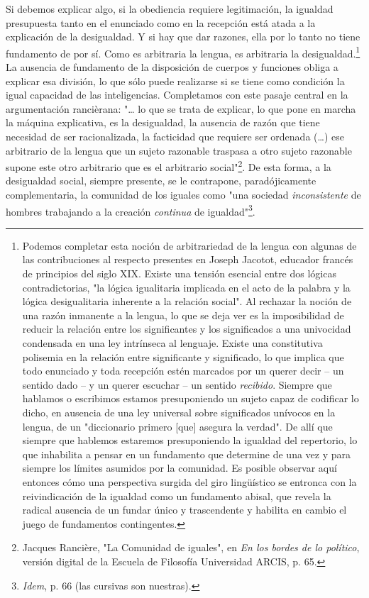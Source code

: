 \documentclass{book}
\begin{document}
Si debemos explicar algo, si la obediencia requiere legitimación, la
igualdad presupuesta tanto en el enunciado como en la recepción está
atada a la explicación de la desigualdad. Y si hay que dar razones, ella
por lo tanto no tiene fundamento de por sí. Como es arbitraria la
lengua, es arbitraria la desigualdad.\footnote{Podemos completar esta
  noción de arbitrariedad de la lengua con algunas de las contribuciones
  al respecto presentes en Joseph Jacotot, educador francés de
  principios del siglo XIX. Existe una tensión esencial entre dos
  lógicas contradictorias, "la lógica igualitaria implicada en el acto
  de la palabra y la lógica desigualitaria inherente a la relación
  social". Al rechazar la noción de una razón inmanente a la lengua, lo
  que se deja ver es la imposibilidad de reducir la relación entre los
  significantes y los significados a una univocidad condensada en una
  ley intrínseca al lenguaje. Existe una constitutiva polisemia en la
  relación entre significante y significado, lo que implica que todo
  enunciado y toda recepción estén marcados por un querer decir -- un
  sentido dado -- y un querer escuchar -- un sentido \emph{recibido}.
  Siempre que hablamos o escribimos estamos presuponiendo un sujeto
  capaz de codificar lo dicho, en ausencia de una ley universal sobre
  significados unívocos en la lengua, de un "diccionario primero
  {[}que{]} asegura la verdad". De allí que siempre que hablemos
  estaremos presuponiendo la igualdad del repertorio, lo que inhabilita
  a pensar en un fundamento que determine de una vez y para siempre los
  límites asumidos por la comunidad. Es posible observar aquí entonces
  cómo una perspectiva surgida del giro lingüístico se entronca con la
  reivindicación de la igualdad como un fundamento abisal, que revela la
  radical ausencia de un fundar único y trascendente y habilita en
  cambio el juego de fundamentos contingentes.} La ausencia de
fundamento de la disposición de cuerpos y funciones obliga a explicar
esa división, lo que sólo puede realizarse si se tiene como condición la
igual capacidad de las inteligencias. Completamos con este pasaje
central en la argumentación rancièrana: "\ldots{} lo que se trata de
explicar, lo que pone en marcha la máquina explicativa, es la
desigualdad, la ausencia de razón que tiene necesidad de ser
racionalizada, la facticidad que requiere ser ordenada (\dots) ese
arbitrario de la lengua que un sujeto razonable traspasa a otro sujeto
razonable supone este otro arbitrario que es el arbitrario
social"\footnote{Jacques Rancière, "La Comunidad de iguales", en
  \emph{En los bordes de lo político}, versión digital de la Escuela de
  Filosofía Universidad ARCIS, p. 65.}. De esta forma, a la desigualdad
social, siempre presente, se le contrapone, paradójicamente
complementaria, la comunidad de los iguales como "una sociedad
\emph{inconsistente} de hombres trabajando a la creación \emph{continua}
de igualdad"\footnote{\emph{Idem}, p. 66 (las cursivas son nuestras).}.
\end{document}
